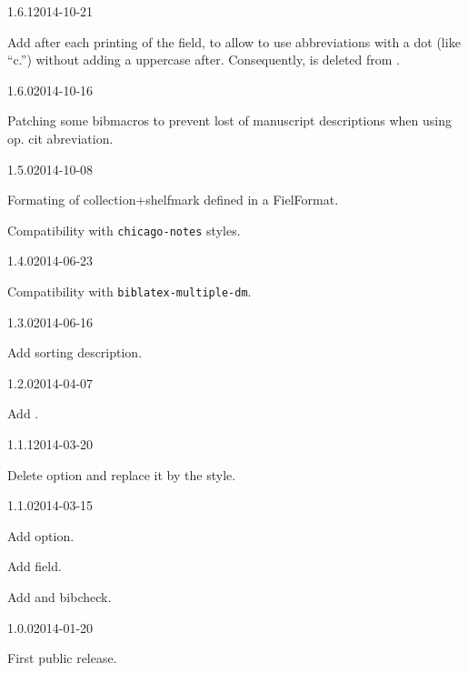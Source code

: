 \documentclass{ltxdockit}[2011/03/25]
\begin{document}
\begin{changelog}
\begin{release}{1.6.1}{2014-10-21}	
  	\item Add  after each printing of the  field, to allow to use abbreviations with a dot (like \enquote{c.}) without adding a uppercase after. Consequently,  is deleted from .
\end{release}

\begin{release}{1.6.0}{2014-10-16}	
  	\item Patching some bibmacros to prevent lost of manuscript descriptions when using  op. cit abreviation.
\end{release}

\begin{release}{1.5.0}{2014-10-08}	
  	\item Formating of collection+shelfmark defined in a FielFormat.
	\item Compatibility with \verb+chicago-notes+ styles.
\end{release}

\begin{release}{1.4.0}{2014-06-23}
	\item Compatibility with \verb+biblatex-multiple-dm+.
\end{release}


\begin{release}{1.3.0}{2014-06-16}
	\item Add sorting description.
\end{release}

\begin{release}{1.2.0}{2014-04-07}
	\item Add .
\end{release}

\begin{release}{1.1.1}{2014-03-20}
	\item Delete  option and replace it by the  style. 
\end{release}

\begin{release}{1.1.0}{2014-03-15}
\item Add  option.
\item Add  field.
\item Add  and  bibcheck. 
\end{release}

\begin{release}{1.0.0}{2014-01-20}
\item First public release.
\end{release}
\end{changelog}
\end{document}
